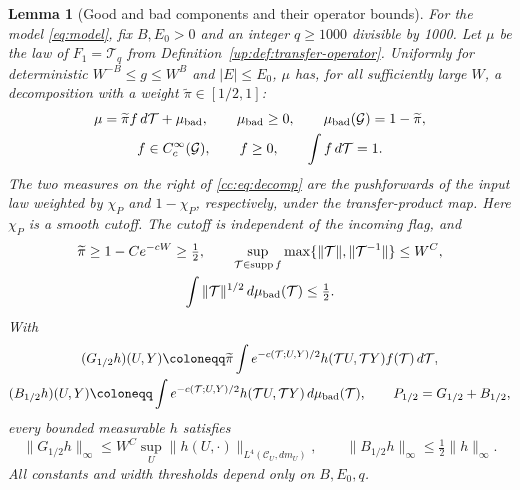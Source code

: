 \documentclass[11pt]{article}
\numberwithin{equation}{section}
\newtheorem{lemma}[theorem]{Lemma}
\theoremstyle{remark}
\newcommand{\supp}{\operatorname{supp}}
\begin{document}
\begin{lemma}[Good and bad components and their operator bounds]
\label{up:lem:good-bad}
For the model \eqref{eq:model}, fix $B,E_0>0$ and an integer
$q\ge1000$ divisible by 1000. Let $\mu$ be the law of
$F_1=\mathcal T_q$ from Definition~\ref{up:def:transfer-operator}.
Uniformly for deterministic $W^{-B}\le g\le W^B$ and $|E|\le E_0$, $\mu$ has,
for all sufficiently large $W$, a decomposition with a weight
$\widetilde{\pi}\in[1/2,1]$:
\begin{equation}\label{cc:eq:decomp}
 \begin{gathered}
 \mu=\widetilde{\pi} f\,d\mathcal T+\mu_{\rm bad},\qquad
 \mu_{\rm bad}\ge0,\qquad \mu_{\rm bad}(\mathcal G)=1-\widetilde{\pi},\\
 f\in C_c^\infty(\mathcal G),\qquad f\ge0,\qquad\int f\,d\mathcal T=1.
 \end{gathered}
\end{equation}
The two measures on the right of \eqref{cc:eq:decomp} are the pushforwards
of the input law weighted by $\chi_P$ and $1-\chi_P$, respectively,
under the transfer-product map. Here $\chi_P$ is a smooth cutoff.
The cutoff is independent of the incoming flag, and
\begin{equation}\label{up:eq:coarse-density}
 \begin{gathered}
 \widetilde{\pi}\ge1-Ce^{-cW}\ge\tfrac12,\qquad
 \sup_{\mathcal T\in\supp f}\max\{\|\mathcal T\|,\|\mathcal T^{-1}\|\}\le W^C,\\
 \int\|\mathcal T\|^{1/2}\,d\mu_{\rm bad}(\mathcal T)\le\tfrac12.
 \end{gathered}
\end{equation}
With
\begin{equation}\label{eq:c-good-bad-operators}
 \begin{gathered}
 (G_{1/2}h)(U,Y)\coloneqq
       \widetilde{\pi}\int e^{-c(\mathcal T;U,Y)/2}h(\mathcal T U,\mathcal T Y)f(\mathcal T)\,d\mathcal T,\\
 (B_{1/2}h)(U,Y)\coloneqq
       \int e^{-c(\mathcal T;U,Y)/2}h(\mathcal T U,\mathcal T Y)\,d\mu_{\rm bad}(\mathcal T),\qquad
 P_{1/2}=G_{1/2}+B_{1/2},
 \end{gathered}
\end{equation}
every bounded measurable $h$ satisfies
\begin{equation}\label{up:eq:GB-bounds}
 \|G_{1/2}h\|_\infty
 \le W^C\sup_U\|h(U,\cdot)\|_{L^4(\mathcal C_U,dm_U)},\qquad
 \|B_{1/2}h\|_\infty\le\tfrac12\|h\|_\infty.
\end{equation}
All constants and width thresholds depend only on $B,E_0,q$.
\end{lemma}
\end{document}
